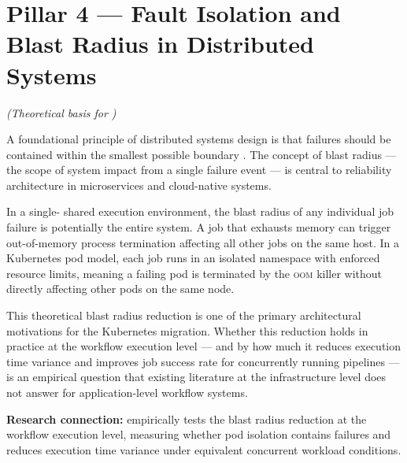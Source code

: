 \section{Pillar 4 --- Fault Isolation and Blast Radius in Distributed Systems}
\textit{(Theoretical basis for )}

A foundational principle of distributed systems design is that failures should be contained
within the smallest possible boundary \citep{tran2022}. The concept of blast radius --- the
scope of system impact from a single failure event --- is central to reliability
architecture in microservices and cloud-native systems.

In a single-\vm{} shared execution environment, the blast radius of any individual job
failure is potentially the entire system. A job that exhausts memory can trigger
out-of-memory process termination affecting all other jobs on the same host. In a
Kubernetes pod model, each job runs in an isolated namespace with enforced resource limits,
meaning a failing pod is terminated by the \textsc{oom} killer without directly affecting
other pods on the same node.

This theoretical blast radius reduction is one of the primary architectural motivations for
the Kubernetes migration. Whether this reduction holds in practice at the workflow execution
level --- and by how much it reduces execution time variance and improves job success rate
for concurrently running pipelines --- is an empirical question that existing literature
at the infrastructure level does not answer for application-level workflow systems.

\textbf{Research connection:}  empirically tests the blast radius reduction at the
workflow execution level, measuring whether pod isolation contains failures and reduces
execution time variance under equivalent concurrent workload conditions.
